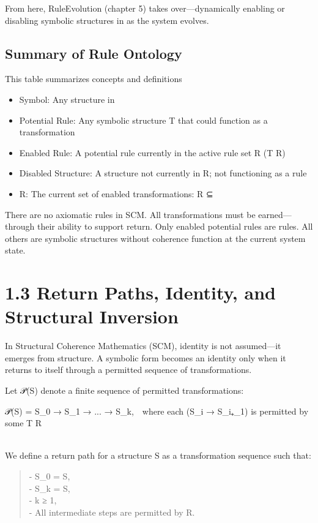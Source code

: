 From here, RuleEvolution (chapter 5) takes over---dynamically enabling
or disabling symbolic structures in \Sigma* as the system evolves.

\subsection{Summary of Rule Ontology}\label{summary-of-rule-ontology}

This table summarizes concepts and definitions

\begin{itemize}
\item
  Symbol: Any structure in \Sigma*
\item
  Potential Rule: Any symbolic structure T \in \Sigma* that could function as a
  transformation
\item
  Enabled Rule: A potential rule currently in the active rule set R (T \in
  R)
\item
  Disabled Structure: A structure not currently in R; not functioning as
  a rule
\item
  R: The current set of enabled transformations: R ⊆ \Sigma*
\end{itemize}

There are no axiomatic rules in SCM. All transformations must be
earned---through their ability to support return. Only enabled potential
rules are rules. All others are symbolic structures without coherence
function at the current system state.

\section{1.3 \textbar{} Return Paths, Identity, and Structural
Inversion}\label{return-paths-identity-and-structural-inversion}

In Structural Coherence Mathematics (SCM), identity is not assumed---it
emerges from structure. A symbolic form becomes an identity only when it
returns to itself through a permitted sequence of transformations.

Let 𝒫(S) denote a finite sequence of permitted transformations:

𝒫(S) = S_0 → S_1 → ... → S_k, where each (S_i → S_i₊_1) is permitted by some T
\in R\\
\strut \\
We define a return path for a structure S as a transformation sequence
such that:

\begin{quote}
- S_0 = S,\\
- S_k = S,\\
- k ≥ 1,\\
- All intermediate steps are permitted by R.
\end{quote}

